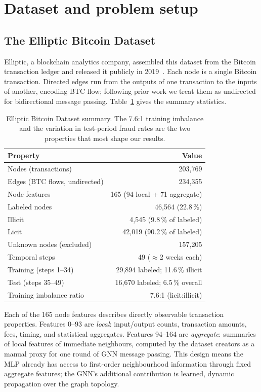 \section{Dataset and problem setup}
\label{sec:dataset}

\subsection{The Elliptic Bitcoin Dataset}

Elliptic, a blockchain analytics company, assembled this dataset from
the Bitcoin transaction ledger and released it publicly in
2019~\citep{weber2019}.  Each node is a single Bitcoin transaction.
Directed edges run from the outputs of one transaction to the inputs
of another, encoding BTC flow; following prior work we treat them as
undirected for bidirectional message passing.
Table~\ref{tab:dataset} gives the summary statistics.

\begin{table}[!htbp]
\centering
\caption{Elliptic Bitcoin Dataset summary.  The 7.6:1 training
imbalance and the variation in test-period fraud rates are the two
properties that most shape our results.}
\label{tab:dataset}
\small
\begin{tabular}{lr}
\toprule
\textbf{Property} & \textbf{Value} \\
\midrule
Nodes (transactions) & 203,769 \\
Edges (BTC flows, undirected) & 234,355 \\
Node features & 165 \quad (94 local + 71 aggregate) \\
Labeled nodes & 46,564 \quad (22.8\,\%) \\
\quad Illicit & 4,545 \quad (9.8\,\% of labeled) \\
\quad Licit & 42,019 \quad (90.2\,\% of labeled) \\
Unknown nodes (excluded) & 157,205 \\
Temporal steps & 49 ($\approx$2 weeks each) \\
Training (steps 1--34) & 29,894 labeled; 11.6\,\% illicit \\
Test (steps 35--49) & 16,670 labeled; 6.5\,\% overall \\
Training imbalance ratio & 7.6:1 (licit:illicit) \\
\bottomrule
\end{tabular}
\end{table}

Each of the 165 node features describes directly observable transaction
properties.  Features 0--93 are \emph{local}: input/output counts,
transaction amounts, fees, timing, and statistical aggregates.
Features 94--164 are \emph{aggregate}: summaries of local features of
immediate neighbours, computed by the dataset creators as a manual
proxy for one round of GNN message passing.  This design means the MLP
already has access to first-order neighbourhood information through
fixed aggregate features; the GNN's additional contribution is
learned, dynamic propagation over the graph topology.

